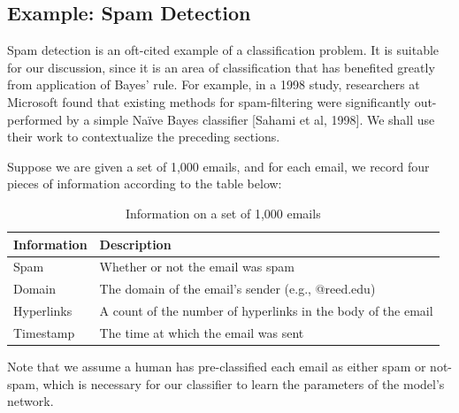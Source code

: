 \documentclass[12pt,twoside]{reedthesis}
\begin{document}
	\subsection*{Example: Spam Detection}
	Spam detection is an oft-cited example of a classification problem. It is suitable for our discussion, since it is an area of classification that has benefited greatly from application of Bayes' rule. For example, in a 1998 study, researchers at Microsoft found that existing methods for spam-filtering were significantly out-performed by a simple Na\"{i}ve Bayes classifier [Sahami et al, 1998]. We shall use their work to contextualize the preceding sections.
	
	Suppose we are given a set of 1,000 emails, and for each email, we record four pieces of information according to the table below:
	
		\begin{table}[htdp] %
\caption[Example Data for Classifications]{Information on a set of 1,000 emails} 
\begin{center}
\begin{tabular}{| l | l |} 
 \toprule
  \textbf{Information} & \textbf{Description} \\ %
  \midrule %
   	Spam & Whether or not the email was spam \\
 	Domain & The domain of the email's sender (e.g., @reed.edu) \\	
	Hyperlinks & A count of the number of hyperlinks in the body of the email \\ %
  	Timestamp & The time at which the email was sent \\
\bottomrule %
\end{tabular}
\end{center}
\label{bvf} %
\end{table}
	Note that we assume a human has pre-classified each email as either spam or not-spam, which is necessary for our classifier to learn the parameters of the model's network.
	
\end{document}
